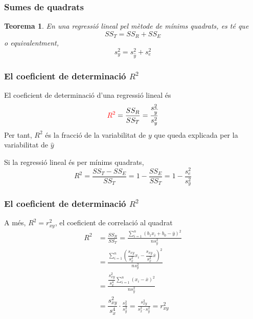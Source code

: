 \documentclass[12pt,t]{beamer}
\newcommand{\red}[1]{\textcolor{red}{#1}}
\renewcommand{\emph}[1]{{\color{red}#1}}
\theoremstyle{plain}
\newtheorem{teorema}{Teorema}
\theoremstyle{definition}
\begin{document}
\begin{frame}
\frametitle{Sumes de quadrats}

\begin{teorema}
En una regressió lineal pel mètode de mínims quadrats, es té que
$$
SS_T=SS_R+SS_E
$$
o equivalentment,
$$
s^2_y=s^2_{\widehat{y}}+s^2_e
$$
\end{teorema}

\end{frame}
%
%
%
%
%
%
%

\begin{frame}
\frametitle{El coeficient de determinació $R^2$}
El \emph{coeficient de determinació} d'una regressió lineal és
$$
\red{R^2}=\frac{SS_R}{SS_T}=\frac{s_{\widehat{y}}^2}{s_y^2}
$$
Per tant, $R^2$ és la fracció de la variabilitat de $y$ que queda explicada per la variabilitat de $\widehat{y}$
\bigskip


Si la regressió lineal és per mínims quadrats,
$$
R^2=\frac{SS_T-SS_E}{SS_T}=1-\frac{SS_E}{SS_T}=1-\frac{s_e^2}{s_y^2}
$$
\end{frame}


\begin{frame}
\frametitle{El coeficient de determinació $R^2$}
A més, \emph{$R^2=r_{xy}^2$}, el coeficient de correlació al quadrat
$$
\begin{array}{rl}
R^2 & \displaystyle =\frac{SS_R}{SS_T}=\frac{\sum\limits_{i=1}^n(b_1x_i+b_0-\overline{y})^2}{ns_y^2}\\[2ex] 
& \displaystyle =\frac{\sum\limits_{i=1}^n(\dfrac{s_{xy}}{s_x^2}x_i-\dfrac{s_{xy}}{s_x^2}\overline{x})^2}{ns_y^2}\\[2ex] 
& \displaystyle =\frac{\dfrac{s_{xy}^2}{s_x^4}\sum\limits_{i=1}^n(x_i-\overline{x})^2}{ns_y^2}\\[2ex] & \displaystyle =\dfrac{s_{xy}^2}{s_x^4}\cdot \frac{s_x^2}{s_y^2}=\frac{s_{xy}^2}{s_x^2\cdot s_y^2}=r_{xy}^2
\end{array}
$$
\end{frame}
\end{document}
